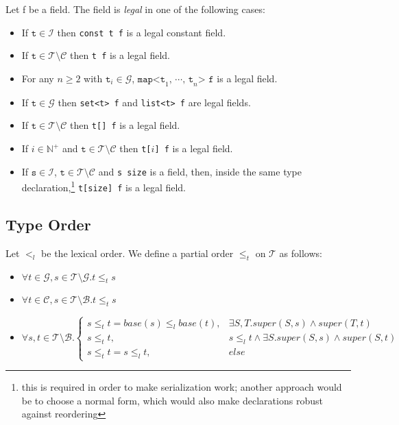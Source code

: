 \documentclass[a4paper,10pt]{article}
\begin{document}
Let f be a field. The field is \textit{legal} in one of the following cases:
\begin{itemize}
 \item If $\texttt{t} \in \mathcal{I}$ then \verb/const t f/ is a legal constant field.
 
 \item If $\texttt{t} \in \mathcal{T}\setminus\mathcal{C}$ then \verb/t f/ is a legal field.
 
 \item For any $n \geq 2$ with $\texttt{t}_i \in \mathcal{G}$, $\texttt{map<t}_1\texttt{, }\cdots\texttt{, t}_n\texttt{> f}$ is a legal field.
 
 \item If $\texttt{t} \in \mathcal{G}$ then \verb/set<t> f/ and \verb/list<t> f/ are legal fields.
 
 \item If $\texttt{t} \in \mathcal{T}\setminus\mathcal{C}$ then \verb/t[] f/ is a legal field.
 
 \item If $i \in \mathbb{N}^+$ and $\texttt{t} \in \mathcal{T}\setminus\mathcal{C}$ then \verb/t[/$i$\verb/] f/ is a legal field.
 
 \item If $\texttt{s} \in \mathcal{I}$, $\texttt{t} \in \mathcal{T}\setminus\mathcal{C}$ and \verb/s size/ is a field, then, inside the same type declaration,\footnote{this is required in order to make serialization work; another approach would be to choose a normal form, which would also make declarations robust against reordering}
  \verb/t[size] f/ is a legal field.
 
\end{itemize}

\subsection*{Type Order}

Let $<_l$ be the lexical order. We define a partial order $\leq_t$ on $\mathcal{T}$ as follows:
\begin{itemize}
 \item $\forall t \in \mathcal{G}, s \in \mathcal{T}\setminus\mathcal{G}. t \leq_t s$
 \item $\forall t \in \mathcal{C}, s \in \mathcal{T}\setminus\mathcal{B}. t \leq_t s$
 \item $\forall s,t \in \mathcal{T}\setminus\mathcal{B}.\begin{cases}
 s \leq_t t = base(s) \leq_l base(t), &\exists S,T. super(S,s) \wedge super(T, t)\\
 s \leq_t t, & s \leq_l t \wedge \exists S. super(S,s) \wedge super(S,t)\\
 s \leq_t t = s \leq_l t, & else
 \end{cases}$
\end{itemize}
\end{document}
